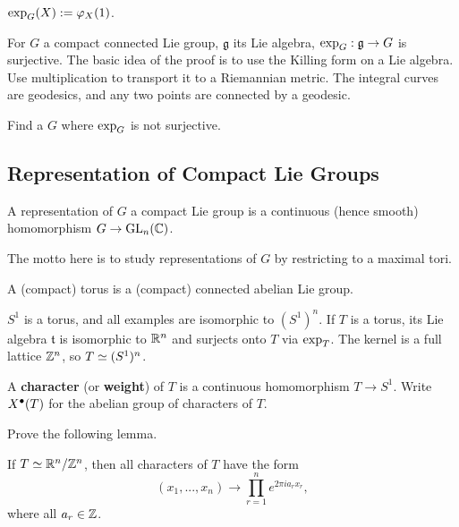 \begin{defn}
$\operatorname{exp}_G(X) := \varphi_X(1)$.
\end{defn}

\begin{rmk}
For $G$ a compact connected Lie group, $\mathfrak{g}$ its Lie algebra,
$\operatorname{exp}_G: \mathfrak{g} \rightarrow G$ is surjective. The basic idea of the
proof is to use the Killing form on a Lie algebra. Use multiplication to 
transport it to a Riemannian metric. The integral curves are geodesics, and any
two points are connected by a geodesic.
\end{rmk}

\begin{ex}
Find a $G$ where $\operatorname{exp}_G$ is not surjective.
\end{ex}

\subsection{Representation of Compact Lie Groups}

\begin{defn}
A representation of $G$ a compact Lie group is a continuous (hence smooth)
homomorphism $G \rightarrow \mathrm{GL}_{n}({\mathbb{C}})$.
\end{defn}

The motto here is to study representations of $G$ by restricting to a maximal
tori.

\begin{defn}
A (compact) torus is a (compact) connected abelian Lie group.
\end{defn}

\begin{exmpl}
$S^1$ is a torus, and all examples are isomorphic to $(S^1)^n$. If $T$ is a 
torus, its Lie algebra $\mathfrak{t}$ is isomorphic to $\mathbb{R}^n$ and surjects
onto $T$ via $\operatorname{exp}_T$. The kernel is a full lattice $\mathbb{Z}^n$, so
$T \simeq (S^1)^n$.
\end{exmpl}

\begin{defn}
A \textbf{character} (or \textbf{weight}) of $T$ is a continuous homomorphism
$T \rightarrow S^1$. Write $X^\bullet(T)$ for the abelian group of characters of
$T$.
\end{defn}

\begin{ex}
Prove the following lemma.
\begin{lem}
If $T \simeq \mathbb{R}^n/\mathbb{Z}^n$, then all characters of $T$ have the form
\[ (x_1, ..., x_n) \rightarrow \prod_{r = 1}^n e^{2 \pi i a_r x_r}, \]
where all $a_r \in \mathbb{Z}$.
\end{lem}
\end{ex}

